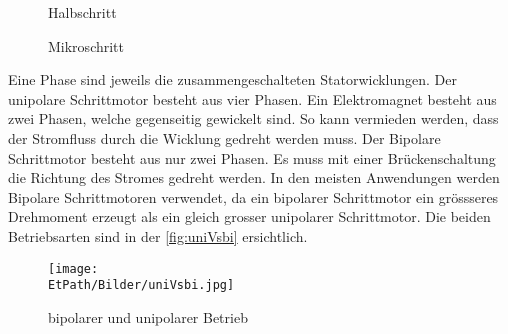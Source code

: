      \begin{figure}[H]
     	\centering
     	\caption{Halbschritt}
     	\label{fig:halbschritt}
     \end{figure}
    \begin{figure}[H]
    	\centering
    	\caption{Mikroschritt}
    	\label{fig:mikroschritt}
    \end{figure}
    Eine Phase sind jeweils die zusammengeschalteten Statorwicklungen. Der unipolare Schrittmotor besteht aus vier Phasen. Ein Elektromagnet besteht aus zwei Phasen, welche gegenseitig gewickelt sind. So kann vermieden werden, dass der Stromfluss durch die Wicklung gedreht werden muss. Der Bipolare Schrittmotor besteht aus nur zwei Phasen. Es muss mit einer Brückenschaltung die Richtung des Stromes gedreht werden. In den meisten Anwendungen werden Bipolare Schrittmotoren verwendet, da ein bipolarer Schrittmotor ein grössseres Drehmoment erzeugt als ein gleich grosser unipolarer Schrittmotor. Die beiden Betriebsarten sind in der \autoref{fig:uniVsbi} ersichtlich. 
    \begin{figure}[H]
       	\centering
       	\texttt{[image: \\EtPath/Bilder/uniVsbi.jpg]}
       	\caption{bipolarer und unipolarer Betrieb}
       	\label{fig:uniVsbi}
    \end{figure}
    
       
    
